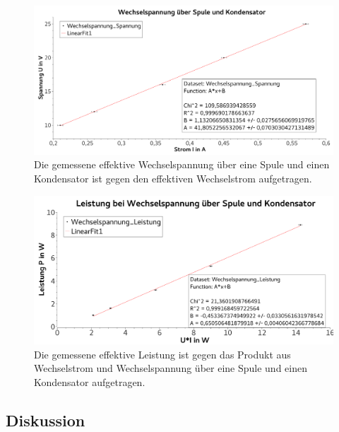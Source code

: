 \documentclass[
	a4paper,
	12pt,
	pagesize,
	ngerman
]{scrartcl}
\begin{document}
	\begin{figure}[tb]
		\includegraphics[width=1\textwidth]{KondensatorSpannungWechsel}
		\centering
		\caption{Die gemessene effektive Wechselspannung über eine Spule und einen Kondensator ist gegen den effektiven Wechselstrom aufgetragen.}
		\label{KondensatorSpannungWechsel}
		\centering
	\end{figure}
	\begin{figure}[tb]
		\includegraphics[width=1\textwidth]{KondensatorLeistungWechsel}
		\centering
		\caption{Die gemessene effektive Leistung ist gegen das Produkt aus Wechselstrom und Wechselspannung über eine Spule und einen Kondensator aufgetragen.}
		\label{KondensatorLeistungWechsel}
		\centering
	\end{figure}
	



	




	\subsection{Diskussion}
\end{document}
